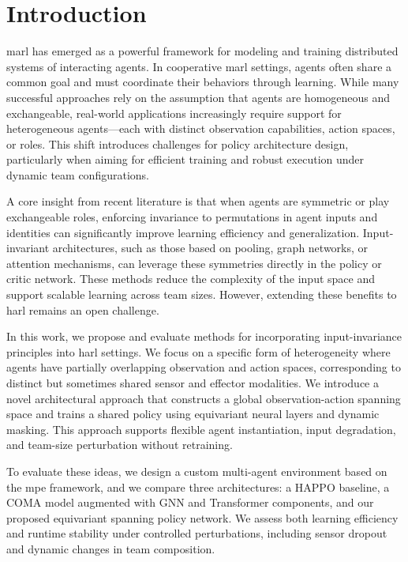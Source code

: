 
\section{Introduction}

\Gls{marl} has emerged as a powerful framework for modeling and 
training distributed systems of interacting agents. 
In cooperative \gls{marl} settings, agents often share a common goal and 
must coordinate their behaviors through learning. 
While many successful approaches rely on the assumption that agents are 
homogeneous and exchangeable, real-world applications increasingly 
require support for heterogeneous agents—each with distinct observation capabilities, 
action spaces, or roles. 
This shift introduces challenges for policy architecture design, 
particularly when aiming for efficient training and robust 
execution under dynamic team configurations.

A core insight from recent literature is that when agents are symmetric or 
play exchangeable roles, enforcing invariance to permutations in agent inputs 
and identities can significantly improve learning efficiency and generalization. 
Input-invariant architectures, such as those based on pooling, graph networks, 
or attention mechanisms, can leverage these symmetries directly in the 
policy or critic network. These methods reduce the complexity of the 
input space and support scalable learning across team sizes. 
However, extending these benefits to \gls{harl} remains an open challenge.

In this work, we propose and evaluate methods for incorporating 
input-invariance principles into \gls{harl} settings. 
We focus on a specific form of heterogeneity where agents 
have partially overlapping observation and action spaces, 
corresponding to distinct but sometimes shared sensor and effector modalities. 
We introduce a novel architectural approach that constructs a 
global observation-action spanning space and trains a 
shared policy using equivariant neural layers and dynamic masking. 
This approach supports flexible agent instantiation, input degradation, 
and team-size perturbation without retraining.

To evaluate these ideas, we design a custom multi-agent 
environment based on the \gls{mpe} framework, and we compare three architectures: 
a HAPPO baseline, a COMA model augmented with GNN and Transformer components, 
and our proposed equivariant spanning policy network. 
We assess both learning efficiency and runtime stability 
under controlled perturbations, including sensor dropout 
and dynamic changes in team composition.

